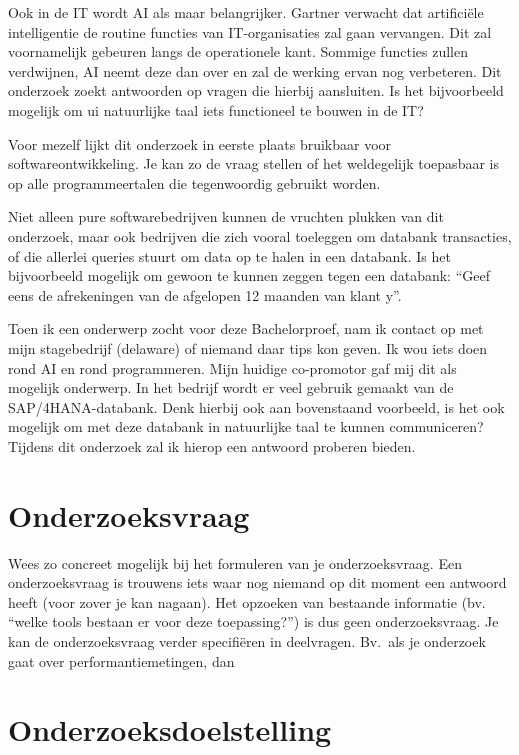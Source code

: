 Ook in de IT wordt AI als maar belangrijker. Gartner verwacht dat artificiële intelligentie de routine functies van IT-organisaties zal gaan vervangen. Dit zal voornamelijk  gebeuren langs de operationele kant. Sommige functies zullen verdwijnen, AI neemt deze dan over en zal de werking ervan nog verbeteren. Dit onderzoek zoekt antwoorden op vragen die hierbij aansluiten. Is het bijvoorbeeld mogelijk om ui natuurlijke taal iets functioneel te bouwen in de IT? 

Voor mezelf lijkt dit onderzoek in eerste plaats bruikbaar voor softwareontwikkeling. Je kan zo de vraag stellen of het weldegelijk toepasbaar is op alle programmeertalen die tegenwoordig gebruikt worden. 

Niet alleen pure softwarebedrijven kunnen de vruchten plukken van dit onderzoek, maar ook bedrijven die zich vooral toeleggen om databank transacties, of die allerlei queries stuurt om data op te halen in een databank. Is het bijvoorbeeld mogelijk om gewoon te kunnen zeggen tegen een databank: “Geef eens de afrekeningen van de afgelopen 12 maanden van klant y”. 

Toen ik een onderwerp zocht voor deze Bachelorproef, nam ik contact op met mijn stagebedrijf (delaware) of niemand daar tips kon geven. Ik wou iets doen rond AI en rond programmeren. Mijn huidige co-promotor gaf mij dit als mogelijk onderwerp. In het bedrijf wordt er veel gebruik gemaakt van de SAP/4HANA-databank. Denk hierbij ook aan bovenstaand voorbeeld, is het ook mogelijk om met deze databank in natuurlijke taal te kunnen communiceren? Tijdens dit onderzoek zal ik hierop een antwoord proberen bieden.

\section{Onderzoeksvraag}
\label{sec:onderzoeksvraag}

Wees zo concreet mogelijk bij het formuleren van je onderzoeksvraag. Een onderzoeksvraag is trouwens iets waar nog niemand op dit moment een antwoord heeft (voor zover je kan nagaan). Het opzoeken van bestaande informatie (bv. ``welke tools bestaan er voor deze toepassing?'') is dus geen onderzoeksvraag. Je kan de onderzoeksvraag verder specifiëren in deelvragen. Bv.~als je onderzoek gaat over performantiemetingen, dan 

\section{Onderzoeksdoelstelling}
\label{sec:onderzoeksdoelstelling}

